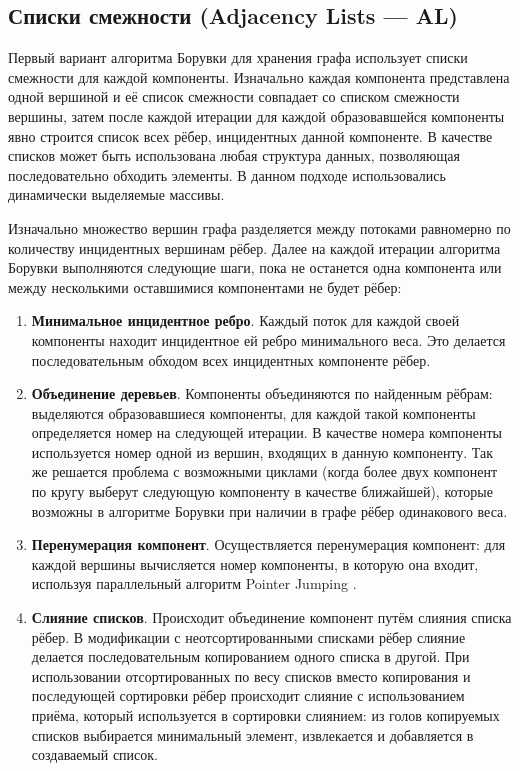 \documentclass[a4paper,12pt]{extarticle}
\begin{document}
\subsection{Списки смежности (Adjacency Lists --- AL)}
\label{subsec:boruvkaAL}

Первый вариант алгоритма Борувки для хранения графа использует списки смежности для каждой компоненты. Изначально каждая компонента представлена одной вершиной и её список смежности совпадает со списком смежности вершины, затем после каждой итерации для каждой образовавшейся компоненты явно строится список всех рёбер, инцидентных данной компоненте.
В качестве списков может быть использована любая структура данных, позволяющая последовательно обходить элементы. В данном подходе использовались динамически выделяемые массивы.

Изначально множество вершин графа разделяется между потоками равномерно по количеству инцидентных вершинам рёбер.
Далее на каждой итерации алгоритма Борувки выполняются следующие шаги, пока не останется одна компонента или между несколькими оставшимися компонентами не будет рёбер:
\begin{enumerate}
    \item \textbf{Минимальное инцидентное ребро}.
        Каждый поток для каждой своей компоненты находит инцидентное ей ребро минимального веса. Это делается последовательным обходом всех инцидентных компоненте рёбер.
    \item \textbf{Объединение деревьев}.
        Компоненты объединяются по найденным рёбрам: выделяются образовавшиеся компоненты, для каждой такой компоненты определяется номер на следующей итерации.
        В качестве номера компоненты используется номер одной из вершин, входящих в данную компоненту.
        Так же решается проблема с возможными циклами (когда более двух компонент по кругу выберут следующую компоненту в качестве ближайшей), которые возможны в алгоритме Борувки при наличии в графе рёбер одинакового веса.
    \item \textbf{Перенумерация компонент}.
          Осуществляется перенумерация компонент: для каждой вершины вычисляется номер компоненты, в которую она входит, используя параллельный алгоритм Pointer Jumping \cite{pointer-jumping}. 
    \item \textbf{Слияние списков}.
        Происходит объединение компонент путём слияния списка рёбер. В модификации с неотсортированными списками рёбер слияние делается последовательным копированием одного списка в другой. При использовании отсортированных по весу списков вместо копирования и последующей сортировки рёбер происходит слияние с использованием приёма, который используется в сортировки слиянием: из голов копируемых списков выбирается минимальный элемент, извлекается и добавляется в создаваемый список.
\end{enumerate}
\end{document}
